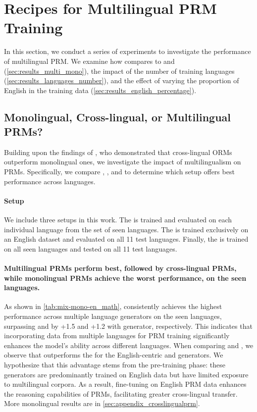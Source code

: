 
\section{Recipes for Multilingual PRM Training}
\label{sec:results}

In this section, we conduct a series of experiments to investigate the performance of multilingual PRM. We examine how \mix compares to \mono and \en (\autoref{sec:results_multi_mono}), the impact of the number of training languages (\autoref{sec:results_languages_number}), and the effect of varying the proportion of English in the training data (\autoref{sec:results_english_percentage}).

\subsection{Monolingual, Cross-lingual, or Multilingual PRMs?}
\label{sec:results_multi_mono}


Building upon the findings of \citet{multiorm}, who demonstrated that cross-lingual ORMs outperform monolingual ones, we investigate the impact of multilingualism on PRMs. Specifically, we compare \mono, \en, and \mix to determine which setup offers best performance across languages.


\paragraph{Setup}


We include three setups in this work. The \mono is trained and evaluated on each individual language from the set of seen languages. The \en is trained exclusively on an English dataset and evaluated on all 11 test languages. Finally, the \mix is trained on all seen languages and tested on all 11 test languages.


\paragraph{Multilingual PRMs perform best, followed by cross-lingual PRMs, while monolingual PRMs achieve the worst performance, on the seen languages.}

As shown in \autoref{tab:mix-mono-en_math}, \mix consistently achieves the highest performance across multiple language generators on the seen languages, surpassing \mono and \en by +1.5 and +1.2 with \llama generator, respectively. This indicates that incorporating data from multiple languages for PRM training significantly enhances the model's ability  across different languages. When comparing \mono and \en, we observe that \en outperforms the \mono for the English-centric \mistral and \llama generators. We hypothesize that this advantage stems from the pre-training phase: these generators are predominantly trained on English data but have limited exposure to multilingual corpora. As a result, fine-tuning on English PRM data enhances the reasoning capabilities of PRMs, facilitating greater cross-lingual transfer.
More monolingual results are in \autoref{sec:appendix_crosslingualprm}.




